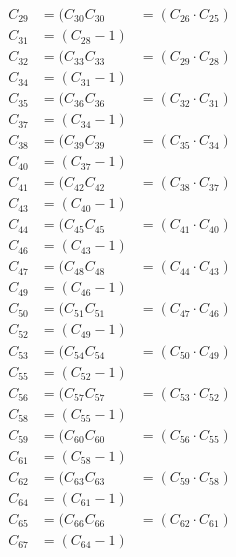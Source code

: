 \documentclass[10pt, a4paper]{article}
\begin{document}
\begin{align*}
C_29 &= (C_{30} %
C_30 &= (C_{26}  \cdot  C_{25}) \\
C_31 &= (C_{28} - 1) \\
C_32 &= (C_{33} %
C_33 &= (C_{29}  \cdot  C_{28}) \\
C_34 &= (C_{31} - 1) \\
C_35 &= (C_{36} %
C_36 &= (C_{32}  \cdot  C_{31}) \\
C_37 &= (C_{34} - 1) \\
C_38 &= (C_{39} %
C_39 &= (C_{35}  \cdot  C_{34}) \\
C_40 &= (C_{37} - 1) \\
C_41 &= (C_{42} %
C_42 &= (C_{38}  \cdot  C_{37}) \\
C_43 &= (C_{40} - 1) \\
C_44 &= (C_{45} %
C_45 &= (C_{41}  \cdot  C_{40}) \\
C_46 &= (C_{43} - 1) \\
C_47 &= (C_{48} %
C_48 &= (C_{44}  \cdot  C_{43}) \\
C_49 &= (C_{46} - 1) \\
C_50 &= (C_{51} %
C_51 &= (C_{47}  \cdot  C_{46}) \\
C_52 &= (C_{49} - 1) \\
C_53 &= (C_{54} %
C_54 &= (C_{50}  \cdot  C_{49}) \\
C_55 &= (C_{52} - 1) \\
C_56 &= (C_{57} %
C_57 &= (C_{53}  \cdot  C_{52}) \\
C_58 &= (C_{55} - 1) \\
C_59 &= (C_{60} %
C_60 &= (C_{56}  \cdot  C_{55}) \\
C_61 &= (C_{58} - 1) \\
C_62 &= (C_{63} %
C_63 &= (C_{59}  \cdot  C_{58}) \\
C_64 &= (C_{61} - 1) \\
C_65 &= (C_{66} %
C_66 &= (C_{62}  \cdot  C_{61}) \\
C_67 &= (C_{64} - 1) \\

\end{align*}
\end{document}
